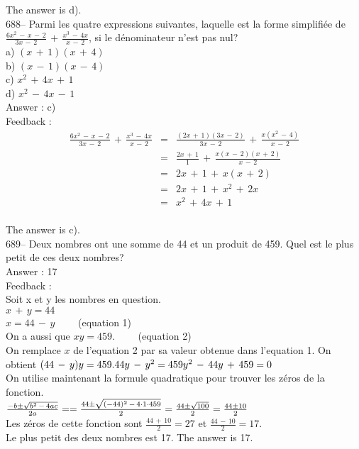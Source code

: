 \documentclass[letterpaper, 12pt]{article}
\begin{document}
The answer is d).\\

688-- Parmi les quatre expressions suivantes, laquelle est la forme
simplifi\'ee de
$\frac{6x^{2}\,-\,x\,-\,2}{3x\,-\,2}\,+\,\frac{x^{3}\,-\,4x}{x\,-\,2}$, si
le d\'enominateur n'est pas nul?\\
a) $(x\,+\,1)(x\,+\,4)$\\
b) $(x\,-\,1)(x\,-\,4)$\\
c) $x^{2}\,+\,4x\,+\,1$\\
d) $x^{2}\,-\,4x\,-\,1$\\

Answer : c)\\

Feedback : \\
\begin{eqnarray*}
\frac{6x^{2}\,-\,x\,-\,2}{3x\,-\,2}\,+\,\frac{x^{3}\,-\,4x}{x\,-\,2}&=&\frac{(2x\,+\,1)(3x\,-\,2)}{3x\,-\,2}\,+\,\frac{x(x^{2}\,-\,4)}{x\,-\,2}\\[2mm]
&=&\frac{2x\,+\,1}{1}\,+\,\frac{x(x\,-\,2)(x\,+\,2)}{x\,-\,2}\\[2mm]
&=&2x\,+\,1\,+\,x(x\,+\,2)\\[2mm]
&=&2x\,+\,1\,+\,x^{2}\,+\,2x\\[2mm]
&=&x^{2}\,+\,4x\,+\,1\\
\end{eqnarray*}

The answer is c).\\

689-- Deux nombres ont une somme de 44 et un produit de 459.  Quel est le
plus petit de ces deux nombres?\\

Answer : 17\\

Feedback : \\
Soit x et y les nombres en question.\\
$x\,+\,y=44$\\
$x=44\,-\,y \qquad$ (equation 1)\\
On a aussi que $xy=459. \qquad$ (equation 2)\\
On remplace $x$ de l'equation 2 par sa valeur obtenue dans l'equation 1.
On obtient $(44\,-\,y)y=459.\\
44y\,-\,y^{2}=459\\
y^{2}\,-\,44y\,+\,459=0$\\

On utilise maintenant la formule quadratique pour trouver les z\'eros de la
fonction.\\[2mm]
$\frac{-b\pm \sqrt{b^{2}\,-\,4ac}}{2a}=\\[2mm]
=\frac{44\pm\sqrt{(-44)^{2}\,-\,4\cdot1\cdot459}}{2}\\[2mm]
=\frac{44\pm \sqrt{100}}{2}\\[2mm]
=\frac{44\pm 10}{2}$\\[2mm]
Les z\'eros de cette fonction sont $\frac{44\,+\,10}{2}=27$ et
$\frac{44\,-\,10}{2}=17$.\\[2mm]
Le plus petit des deux nombres est 17.  The answer is 17.\\
\end{document}
